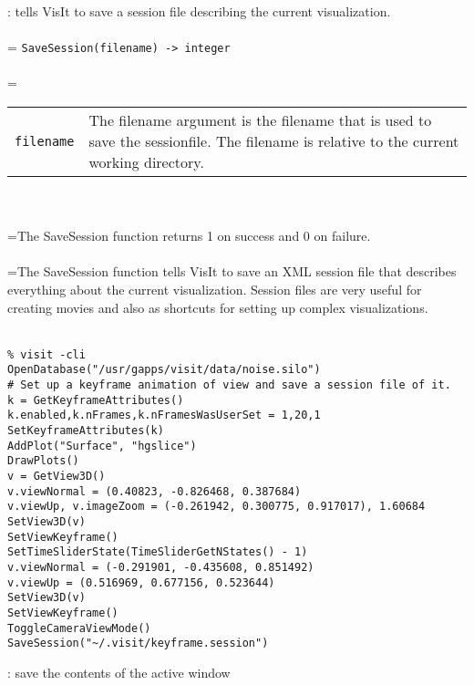 \documentclass[10pt,a4paper]{report}
\begin{document}
{}
: tells VisIt to save a session file describing the current visualization.\\[-3mm]

 \\ 
\hangindent=\parindent 
\verb!SaveSession(filename) -> integer!\\ [-3mm]

 \\ 
\hangindent=\parindent 
\begin{tabular}{lp{9cm}}
\verb!filename! & The filename argument is the filename that is used to save the sessionfile. The filename is relative to the current working directory. \\
\end{tabular} \\[-2mm]


 \\ 
\hangindent=\parindent The SaveSession function returns 1 on success and 0 on failure. \\[-3mm] 

 \\ 
\hangindent=\parindent The SaveSession function tells VisIt to save an XML session file that describes everything about the current visualization. Session files are very useful for creating movies and also as shortcuts for setting up complex visualizations. \\[-3mm] 

\\[-6mm]
\begin{verbatim}% visit -cli
OpenDatabase("/usr/gapps/visit/data/noise.silo")
# Set up a keyframe animation of view and save a session file of it.
k = GetKeyframeAttributes()
k.enabled,k.nFrames,k.nFramesWasUserSet = 1,20,1
SetKeyframeAttributes(k)
AddPlot("Surface", "hgslice")
DrawPlots()
v = GetView3D()
v.viewNormal = (0.40823, -0.826468, 0.387684)
v.viewUp, v.imageZoom = (-0.261942, 0.300775, 0.917017), 1.60684
SetView3D(v)
SetViewKeyframe()
SetTimeSliderState(TimeSliderGetNStates() - 1)
v.viewNormal = (-0.291901, -0.435608, 0.851492)
v.viewUp = (0.516969, 0.677156, 0.523644)
SetView3D(v)
SetViewKeyframe()
ToggleCameraViewMode()
SaveSession("~/.visit/keyframe.session")
\end{verbatim}
\newpage


{}
: save the contents of the active window\\[-3mm]
\end{document}
